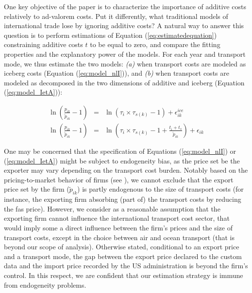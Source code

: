 \documentclass[a4paper,11pt]{article}
\begin{document}
One key objective of the paper is to characterize the importance of additive costs relatively to ad-valorem costs. Put it differently, what traditional models of international trade lose by ignoring additive costs? A natural way to answer this question is to perform estimations of Equation (\ref{eq:estimatedequation}) constraining additive costs $t$ to be equal to zero, and compare the fitting properties and the explanatory power of the models. For each year and transport mode, we thus estimate the two models: \textit{(a)} when transport costs are modeled as iceberg costs (Equation (\ref{eq:model_nlI})), and \textit{(b)} when transport costs are modeled as decomposed in the two dimensions of additive and iceberg (Equation (\ref{eq:model_IetA})):

\begin{eqnarray}
\ln\left(\frac{p_{ik}}{\widetilde{p}_{ik}}-1 \right)&=& \ln \left(\tau_{i}\times\tau_{s(k)}-1 \right) + \epsilon^{ice}_{ik} \label{eq:model_nlI} \\
\ln\left(\frac{p_{ik}}{\widetilde{p}_{ik}}-1 \right)&=& \ln \left(\tau_{i} \times \tau_{s(k)}-1 +\frac{t_{i} + t_{s}}{\widetilde{p}_{ik}}\right) + \epsilon_{ik} \label{eq:model_IetA}
\end{eqnarray}

One may be concerned that the specification of Equations (\ref{eq:model_nlI}) or (\ref{eq:model_IetA}) might be subject to endogeneity bias, as the price set be the exporter may vary depending on the transport cost burden. Notably based on the pricing-to-market behavior of firms (see \citealp{Krugman-87}), we cannot exclude that the export price set by the firm ($\widetilde{p}_{ik}$) is partly endogenous to the size of transport costs (for instance, the exporting firm absorbing (part of) the transport costs by reducing the fas price). However, we consider as a reasonable assumption that the exporting firm cannot influence the international transport cost sector, that would imply some a direct influence between the firm's prices and the size of transport costs, except in the choice between air and ocean transport (that is beyond our scope of analysis). Otherwise stated, conditional to an export price and a transport mode, the gap between the export price declared to the custom data and the import price recorded by the US administration is beyond the firm's control. In this respect, we are confident that our estimation strategy is immune from endogeneity problems. \smallskip
\end{document}
